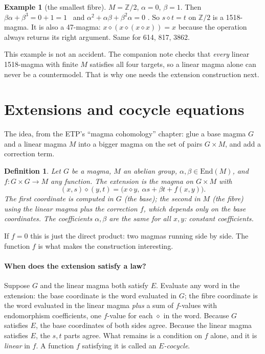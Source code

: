 \documentclass[11pt]{article}
\newtheorem{definition}{Definition}
\theoremstyle{definition}\newtheorem{example}{Example}\newtheorem{exercise}{Exercise}
\theoremstyle{remark}\newtheorem*{remark}{Remark}
\newcommand{\op}{\diamond}
\newcommand{\Z}{\mathbb{Z}}
\newcommand{\End}{\mathrm{End}}
\begin{document}
\begin{example}[the smallest fibre]\label{ex:z2}
$M=\Z/2$, $\alpha=0$, $\beta=1$. Then $\beta\alpha+\beta^3 = 0+1 = 1$ \checkmark\ and $\alpha^2+\alpha\beta+\beta^2\alpha = 0$ \checkmark. So $s\op t = t$ on $\Z/2$ is a 1518-magma. It is also a 47-magma: $x\op(x\op(x\op x)) = x$ because the operation always returns its right argument. Same for 614, 817, 3862.
\end{example}

This example is not an accident. The companion note checks that \emph{every} linear 1518-magma with finite $M$ satisfies all four targets, so a linear magma alone can never be a countermodel. That is why one needs the extension construction next.

\section{Extensions and cocycle equations}\label{sec:ext}

The idea, from the ETP's ``magma cohomology'' chapter: glue a base magma $G$ and a linear magma $M$ into a bigger magma on the set of pairs $G\times M$, and add a correction term.

\begin{definition}
Let $G$ be a magma, $M$ an abelian group, $\alpha,\beta\in\End(M)$, and $f\colon G\times G\to M$ any function. The \emph{extension} is the magma on $G\times M$ with
\begin{equation}\label{eq:ext}
(x,s)\op(y,t) = \bigl(x\op y,\ \alpha s+\beta t+f(x,y)\bigr).
\end{equation}
The first coordinate is computed in $G$ (the \emph{base}); the second in $M$ (the \emph{fibre}) using the linear magma plus the correction $f$, which depends only on the base coordinates. The coefficients $\alpha,\beta$ are the same for all $x,y$: \emph{constant coefficients}.
\end{definition}

If $f=0$ this is just the direct product: two magmas running side by side. The function $f$ is what makes the construction interesting.

\paragraph{When does the extension satisfy a law?} Suppose $G$ and the linear magma both satisfy $E$. Evaluate any word in the extension: the base coordinate is the word evaluated in $G$; the fibre coordinate is the word evaluated in the linear magma \emph{plus} a sum of $f$-values with endomorphism coefficients, one $f$-value for each $\op$ in the word. Because $G$ satisfies $E$, the base coordinates of both sides agree. Because the linear magma satisfies $E$, the $s,t$ parts agree. What remains is a condition on $f$ alone, and it is \emph{linear} in $f$. A function $f$ satisfying it is called an \emph{$E$-cocycle}.
\end{document}
